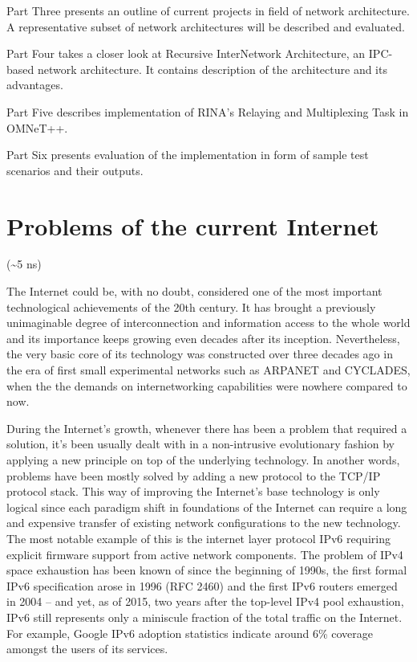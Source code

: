         Part Three presents an outline of current projects in field of network architecture. A representative subset of network architectures will be described and evaluated.

        Part Four takes a closer look at Recursive InterNetwork Architecture, an IPC-based network architecture. It contains description of the architecture and its advantages.

        Part Five describes implementation of RINA's Relaying and Multiplexing Task in OMNeT++.

        Part Six presents evaluation of the implementation in form of sample test scenarios and their outputs.

\chapter{Problems of the current Internet}
    (\textasciitilde5 ns)

    The Internet could be, with no doubt, considered one of the most important technological achievements of the 20th century. It has brought a previously unimaginable degree of interconnection and information access to the whole world and its importance keeps growing even decades after its inception. Nevertheless, the very basic core of its technology was constructed over three decades ago in the era of first small experimental networks such as ARPANET and CYCLADES, when the the demands on internetworking capabilities were nowhere compared to now.

    During the Internet's growth, whenever there has been a problem that required a solution, it's been usually dealt with in a non-intrusive evolutionary fashion by applying a new principle on top of the underlying technology. In another words, problems have been mostly solved by adding a new protocol to the TCP/IP protocol stack. This way of improving the Internet's base technology is only logical since each paradigm shift in foundations of the Internet can require a long and expensive transfer of existing network configurations to the new technology. The most notable example of this is the internet layer protocol IPv6 requiring explicit firmware support from active network components. The problem of IPv4 space exhaustion has been known of since the beginning of 1990s, the first formal IPv6 specification arose in 1996 (RFC 2460) and the first IPv6 routers emerged in 2004 -- and yet, as of 2015, two years after the top-level IPv4 pool exhaustion, IPv6 still represents only a miniscule fraction of the total traffic on the Internet. For example, Google IPv6 adoption statistics indicate around 6\% coverage amongst the users of its services.

